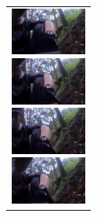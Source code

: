 \begin{figure}[H]
    \begin{tabular}{l}

\\ %

      \begin{minipage}{0.165\hsize}
        \begin{center}
          \includegraphics[clip, width=2.5cm]{./Figures/still_seevictim1.eps}
        \end{center}
      \end{minipage}
      \begin{minipage}{0.165\hsize}
        \begin{center}
          \includegraphics[clip, width=2.5cm]{./Figures/still_seevictim2.eps}
        \end{center}
      \end{minipage}
      \begin{minipage}{0.165\hsize}
        \begin{center}
          \includegraphics[clip, width=2.5cm]{./Figures/still_seevictim3.eps}
        \end{center}
      \end{minipage}
      \begin{minipage}{0.165\hsize}
        \begin{center}
          \includegraphics[clip, width=2.5cm]{./Figures/still_seevictim4.eps}
        \end{center}
      \end{minipage}
      \begin{minipage}{0.165\hsize}
        \begin{center}

\end{center}
\end{minipage}
\end{tabular}
\end{figure}
